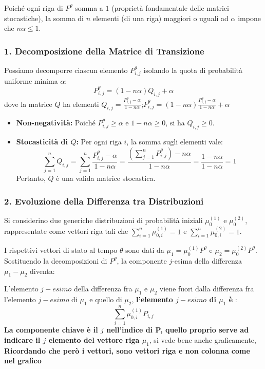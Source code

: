 Poiché ogni riga di $P^\theta$ somma a $1$ (proprietà fondamentale delle matrici stocastiche), la somma di $n$ elementi (di una riga) maggiori o uguali ad $\alpha$ impone che $n\alpha \le 1$.

\subsubsection*{1. Decomposizione della Matrice di Transizione}
Possiamo decomporre ciascun elemento $P^\theta_{i,j}$ isolando la quota di probabilità uniforme minima $\alpha$:
\begin{equation}
P^\theta_{i,j} = (1 - n\alpha) Q_{i,j} + \alpha
\end{equation}
dove la matrice $Q$ ha elementi $Q_{i,j} = \frac{P^\theta_{i,j} - \alpha}{1 - n\alpha}$;$P^\theta_{i,j} = (1 - n\alpha) \frac{P^\theta_{i,j} - \alpha}{1 - n\alpha} + \alpha $
\begin{itemize}
    \item \textbf{Non-negatività:} Poiché $P^\theta_{i,j} \ge \alpha$ e $1 - n\alpha \ge 0$, si ha $Q_{i,j} \ge 0$.
    \item \textbf{Stocasticità di $Q$:} Per ogni riga $i$, la somma sugli elementi vale:
    $$\sum_{j=1}^n Q_{i,j} = \sum_{j=1}^n \frac{P^\theta_{i,j} - \alpha}{1 - n\alpha} = \frac{\left(\sum_{j=1}^n P^\theta_{i,j}\right) - n\alpha}{1 - n\alpha} = \frac{1 - n\alpha}{1 - n\alpha} = 1$$
    Pertanto, $Q$ è una valida matrice stocastica.
\end{itemize}

\subsubsection*{2. Evoluzione della Differenza tra Distribuzioni}
Si considerino due generiche distribuzioni di probabilità iniziali $\mu_0^{(1)}$ e $\mu_0^{(2)}$, rappresentate come vettori riga tali che $\sum_{i=1}^n \mu_{0,i}^{(1)} = 1$ e $\sum_{i=1}^n \mu_{0,i}^{(2)} = 1$. 

I rispettivi vettori di stato al tempo $\theta$ sono dati da $\mu_1 = \mu_0^{(1)} P^\theta$ e $\mu_2 = \mu_0^{(2)} P^\theta$. Sostituendo la decomposizioni di $P^\theta$, la componente $j$-esima della differenza $\mu_1 - \mu_2$ diventa:


L'elemento $j-esimo$ della differenza fra $\mu_1$ e $\mu_2$ viene fuori dalla differenza fra l'elemento $j-esimo$ di $\mu_1$ e quello di $\mu_2$, \textbf{l'elemento $j-esimo$ di $\mu_1$ è }:
\begin{equation}
    \sum_{i=1}^{n} \mu_{0,i}^{(1)} P_{i,j}
\end{equation}
\textbf{La componente chiave è il $j$ nell'indice di P, quello proprio serve ad indicare il $j$ elemento del vettore riga $\mu_1$}, si vede bene anche graficamente, \textbf{Ricordando che però i vettori, sono vettori riga e non colonna come nel grafico}

